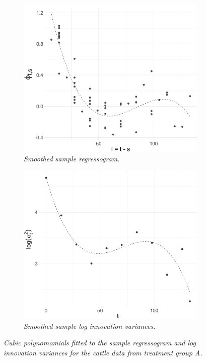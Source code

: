 \begin{figure}[H]
  \centering
 \begin{subfigure}[t]{.65\textwidth}
\includegraphics[width = \textwidth]{img/cattle/cattleA-regressogram-with-cubic-smooth}
 \caption{\textit{Smoothed sample regressogram.} }
 \label{fig:cattleA-innovariogram-with-cubic-smooth}
 \end{subfigure}
 \hfill
   \centering
 \begin{subfigure}[t]{.65\textwidth}
\includegraphics[width = \textwidth]{img/cattle/cattleA-innovariogram-with-cubic-smooth}
 \caption{\textit{Smoothed sample log innovation variances.} }
\label{fig:cattleA-innovariogram-with-cubic-smooth}
 \end{subfigure}
 \caption{\textit{Cubic polynomomials fitted to the sample regressogram and log innovation variances for the cattle data from treatment group A.}} \label{fig:cattleA-smoothed-regressogram-variogram}
\end{figure}


